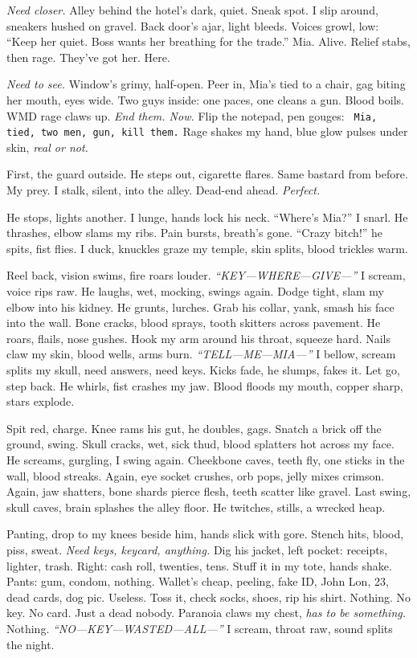 \documentclass[12pt]{article} %
\newcommand{\note}[1]{\texttt{\small \color{DarkGray} #1}}
\begin{document}
\textit{Need closer.} Alley behind the hotel’s dark, quiet. Sneak spot. I slip around, sneakers hushed on gravel. Back door’s ajar, light bleeds. Voices growl, low: “Keep her quiet. Boss wants her breathing for the trade.” \textnormal{Mia}. Alive. Relief stabs, then rage. They’ve got her. Here.

\textit{Need to see.} Window’s grimy, half-open. Peer in, \textnormal{Mia}’s tied to a chair, gag biting her mouth, eyes wide. Two guys inside: one paces, one cleans a gun. Blood boils. WMD rage claws up. \textit{End them. Now.} Flip the notepad, pen gouges: \note{Mia, tied, two men, gun, kill them.} Rage shakes my hand, blue glow pulses under skin, \textit{real or not.}

First, the guard outside. He steps out, cigarette flares. Same bastard from before. My prey. I stalk, silent, into the alley. Dead-end ahead. \textit{Perfect.}

He stops, lights another. I lunge, hands lock his neck. “Where’s \textnormal{Mia}?” I snarl. He thrashes, elbow slams my ribs. Pain bursts, breath’s gone. “Crazy bitch!” he spits, fist flies. I duck, knuckles graze my temple, skin splits, blood trickles warm.

Reel back, vision swims, fire roars louder. \textit{“KEY—WHERE—GIVE—”} I scream, voice rips raw. He laughs, wet, mocking, swings again. Dodge tight, slam my elbow into his kidney. He grunts, lurches. Grab his collar, yank, smash his face into the wall. Bone cracks, blood sprays, tooth skitters across pavement. He roars, flails, nose gushes. Hook my arm around his throat, squeeze hard. Nails claw my skin, blood wells, arms burn. \textit{“TELL—ME—MIA—”} I bellow, scream splits my skull, need answers, need keys. Kicks fade, he slumps, fakes it. Let go, step back. He whirls, fist crashes my jaw. Blood floods my mouth, copper sharp, stars explode.

Spit red, charge. Knee rams his gut, he doubles, gags. Snatch a brick off the ground, swing. Skull cracks, wet, sick thud, blood splatters hot across my face. He screams, gurgling, I swing again. Cheekbone caves, teeth fly, one sticks in the wall, blood streaks. Again, eye socket crushes, orb pops, jelly mixes crimson. Again, jaw shatters, bone shards pierce flesh, teeth scatter like gravel. Last swing, skull caves, brain splashes the alley floor. He twitches, stills, a wrecked heap.

Panting, drop to my knees beside him, hands slick with gore. Stench hits, blood, piss, sweat. \textit{Need keys, keycard, anything.} Dig his jacket, left pocket: receipts, lighter, trash. Right: cash roll, twenties, tens. Stuff it in my tote, hands shake. Pants: gum, condom, nothing. Wallet’s cheap, peeling, fake ID, \textnormal{John Lon}, 23, dead cards, dog pic. Useless. Toss it, check socks, shoes, rip his shirt. Nothing. No key. No card. Just a dead nobody. Paranoia claws my chest, \textit{has to be something.} Nothing. \textit{“NO—KEY—WASTED—ALL—”} I scream, throat raw, sound splits the night.
\end{document}
